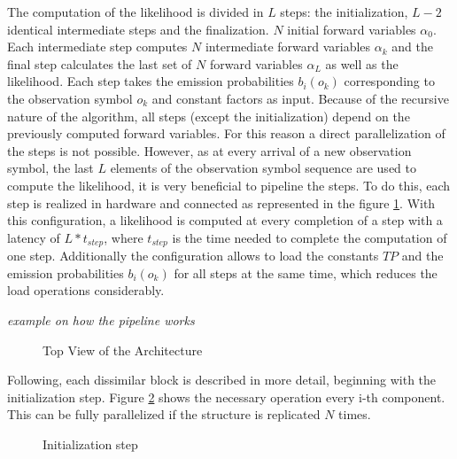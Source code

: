 \documentclass[mscthesis]{usiinfthesis}
\begin{document}
The computation of the likelihood is divided in $ L $ steps: the
initialization, $ L-2 $ identical intermediate steps and the finalization.
$ N $ initial forward variables $ \alpha_0 $. Each intermediate step computes
$ N $ intermediate forward variables $ \alpha_k $ and the final step calculates
the last set of $ N $ forward variables $ \alpha_L $ as well as the likelihood.
Each step takes the emission probabilities $ b_i(o_k) $ corresponding to the
observation symbol $ o_k $ and constant factors as input. Because of the
recursive nature of the algorithm, all steps (except the initialization) depend
on the previously computed forward variables. For this reason a direct
parallelization of the steps is not possible. However, as at every arrival of
a new observation symbol, the last $ L $ elements of the observation symbol
sequence are used to compute the likelihood, it is very beneficial to pipeline
the steps. To do this, each step is realized in hardware and connected as
represented in the figure \ref{fig:arch}. With this configuration, a likelihood
is computed at every completion of a step with a latency of $ L * t_{step} $,
where $ t_{step} $ is the time needed to complete the computation of one step.
Additionally the configuration allows to load the constants $ TP $ and the
emission probabilities $ b_i(o_k) $ for all steps at the same time, which
reduces the load operations considerably.

\emph{\color{red}example on how the pipeline works}

\begin{figure}[h]
    
    \centering
    \def\svgwidth{\columnwidth}
    \caption{Top View of the Architecture}
    \label{fig:arch}
\end{figure}

Following, each dissimilar block is described in more detail, beginning with the
initialization step. Figure \ref{fig:init} shows the necessary operation every
i-th component. This can be fully parallelized if the structure is replicated
$ N $ times.

\begin{figure}[h]
    
    \centering
    \def\svgwidth{\columnwidth}
    \caption{Initialization step}
    \label{fig:init}
\end{figure}
\end{document}
